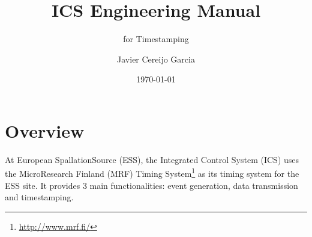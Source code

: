 \documentclass[11pt
  , a4paper
  , article
  , oneside
  , showtrims
]{memoir}
\begin{document}
%

%

%
\date{\today}

%

%

%

%
\title{ICS Engineering Manual}
\subtitle{for Timestamping}
\author{Javier Cereijo Garcia}





\showtrimson

\esstitle
\newpage
\tableofcontents
\newpage



\chapter{Overview}
At European SpallationSource (ESS), the Integrated Control System (ICS) uses the MicroResearch Finland (MRF) Timing System{\footnote{\url{http://www.mrf.fi/}}} as its timing system for the ESS site. It provides 3 main functionalities: event generation, data transmission and timestamping.\\
\end{document}
